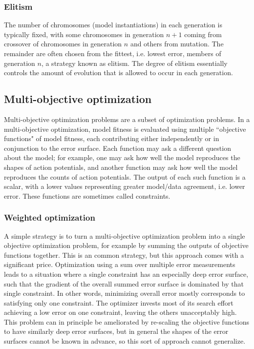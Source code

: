 \subsubsection{Elitism}
The number of chromosomes (model instantiations) in each generation is typically fixed, with some chromosomes in generation $n+1$ coming from crossover of chromosomes in generation $n$ and others from mutation.
The remainder are often chosen from the fittest, i.e. lowest error, members of generation $n$, a strategy known as elitism.
The degree of elitism essentially controls the amount of evolution that is allowed to occur in each generation.

\subsection{Multi-objective optimization} Multi-objective optimization problems are a subset of optimization problems.
In a multi-objective optimization, model fitness is evaluated using multiple ``objective functions" of model fitness, each contributing either independently or in conjunction to the error surface.
Each function may ask a different question about the model; for example, one may ask how well the model reproduces the shapes of action potentials, and another function may ask how well the model reproduces the counts of action potentials.
The output of each such function is a scalar, with a lower values representing greater model/data agreement, i.e. lower error.
These functions are sometimes called constraints. 

\subsubsection{Weighted optimization} A simple strategy is to turn a multi-objective optimization problem into a single objective optimization problem, for example by summing the outputs of objective functions together. 
This is an common strategy, but this approach comes with a significant price.
Optimization using a sum over multiple error measurements leads to a situation where a single constraint has an especially deep error surface, such that the gradient of the overall summed error surface is dominated by that single constraint.
In other words, minimizing overall error mostly corresponds to satisfying only one constraint.
The optimizer invests most of its search effort achieving a low error on one constraint, leaving the others unacceptably high.
This problem can in principle be ameliorated by re-scaling the objective functions to have similarly deep error surfaces, but in general the shapes of the error surfaces cannot be known in advance, so this sort of approach cannot generalize.

